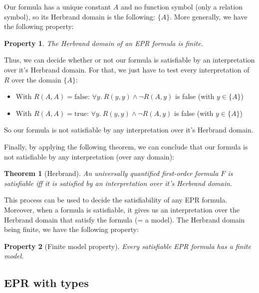 \documentclass[11pt,a4paper,oldfontcommands]{memoir}
\newtheorem*{theorem}{Theorem}
\newtheorem*{property}{Property}
\begin{document}
        Our formula has a unique constant \(A\) and no function symbol (only a relation symbol), so its Herbrand domain is the following:
        \( \{A\} \). More generally, we have the following property:
        
        \begin{property}
        The Herbrand domain of an EPR formula is finite.
        \end{property}

        Thus, we can decide whether or not our formula is satisfiable by an interpretation over it's Herbrand domain.
        For that, we just have to test every interpretation of \(R\) over the domain \( \{A\} \):

        \begin{itemize}
            \item With \(R(A,A)=\text{false}\): \(\forall y. \ R(y,y) \land \neg R(A,y)\) is false (with \( y \in \{A\} \))
            \item With \(R(A,A)=\text{true}\): \(\forall y. \ R(y,y) \land \neg R(A,y)\) is false (with \( y \in \{A\} \))
        \end{itemize}

        So our formula is not satisfiable by any interpretation over it's Herbrand domain.

        Finally, by applying the following theorem, we can conclude that our formula is not satisfiable by any interpretation (over any domain):
        \begin{theorem}[Herbrand]
            An universally quantified first-order formula \(F\) is satisfiable iff it is satisfied by an interpretation over it's Herbrand domain.
        \end{theorem}

        This process can be used to decide the satisfiability of any EPR formula. Moreover, when a formula is satisfiable,
        it gives us an interpretation over the Herbrand domain that satisfy the formula (= a model).
        The Herbrand domain being finite, we have the following property:

        \begin{property}[Finite model property]
            Every satisfiable EPR formula has a finite model.
        \end{property}

        \subsection{EPR with types}
\end{document}
